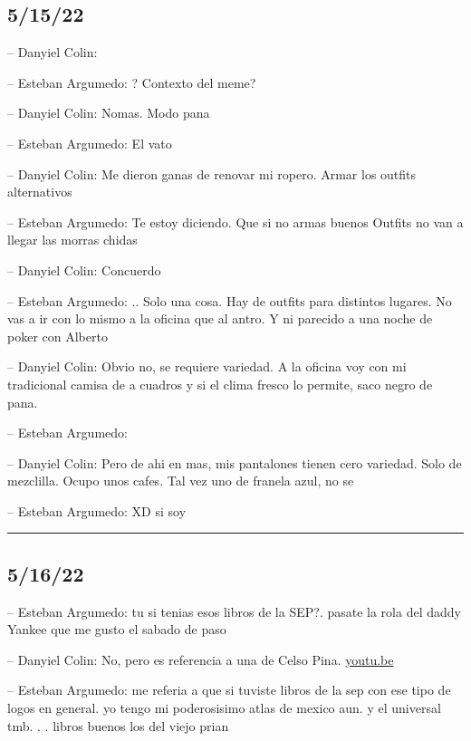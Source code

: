 \hypertarget{section-77}{%
\subsection{5/15/22}\label{section-77}}

-- Danyiel Colin:

-- Esteban Argumedo: ? Contexto del meme?

-- Danyiel Colin: Nomas. Modo pana

-- Esteban Argumedo: El vato

-- Danyiel Colin: Me dieron ganas de renovar mi ropero. Armar los
outfits alternativos

-- Esteban Argumedo: Te estoy diciendo. Que si no armas buenos Outfits
no van a llegar las morras chidas

-- Danyiel Colin: Concuerdo

-- Esteban Argumedo: .. Solo una cosa. Hay de outfits para distintos
lugares. No vas a ir con lo mismo a la oficina que al antro. Y ni
parecido a una noche de poker con Alberto

-- Danyiel Colin: Obvio no, se requiere variedad. A la oficina voy con
mi tradicional camisa de a cuadros y si el clima fresco lo permite, saco
negro de pana.

-- Esteban Argumedo:

-- Danyiel Colin: Pero de ahi en mas, mis pantalones tienen cero
variedad. Solo de mezclilla. Ocupo unos cafes. Tal vez uno de franela
azul, no se

-- Esteban Argumedo: XD si soy

\begin{center}\rule{0.5\linewidth}{0.5pt}\end{center}

\hypertarget{section-78}{%
\subsection{5/16/22}\label{section-78}}

-- Esteban Argumedo: tu si tenias esos libros de la SEP?. pasate la rola
del daddy Yankee que me gusto el sabado de paso

-- Danyiel Colin: No, pero es referencia a una de Celso Pina.
\href{https://youtu.be/VibGLc41UvQ}{youtu.be}

-- Esteban Argumedo: me referia a que si tuviste libros de la sep con
ese tipo de logos en general. yo tengo mi poderosisimo atlas de mexico
aun. y el universal tmb. . . libros buenos los del viejo prian

